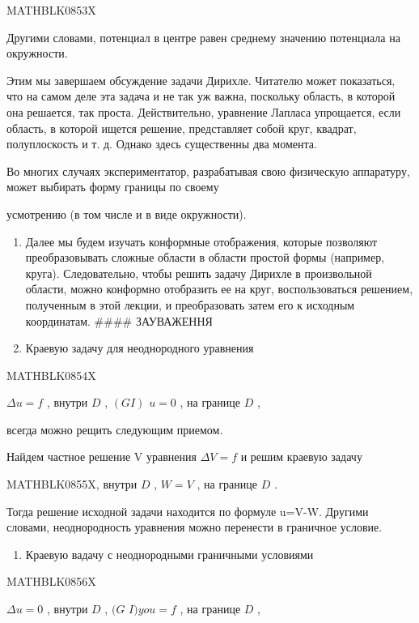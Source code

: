 \documentclass[
  ukrainian,
]{article}
\providecommand{\tightlist}{%
  \setlength{\itemsep}{0pt}\setlength{\parskip}{0pt}}
\begin{document}
MATHBLK0853X

Другими словами, потенциал в центре равен среднему значению потенциала
на окружности.

Этим мы завершаем обсуждение задачи Дирихле. Читателю может показаться,
что на самом деле эта задача и не так уж важна, поскольку область, в
которой она решается, так проста. Действительно, уравнение Лапласа
упрощается, если область, в которой ищется решение, представляет собой
круг, квадрат, полуплоскость и т. д. Однако здесь существенны два
момента.

Во многих случаях экспериментатор, разрабатывая свою физическую
аппаратуру, может выбирать форму границы по своему

усмотрению (в том числе и в виде окружности).

\begin{enumerate}
\def\labelenumi{\arabic{enumi}.}
\setcounter{enumi}{1}
\tightlist
\item
  Далее мы будем изучать конформные отображения, которые позволяют
  преобразовывать сложные области в области простой формы (например,
  круга). Следовательно, чтобы решить задачу Дирихле в произвольной
  области, можно конформно отобразить ее на круг, воспользоваться
  решением, полученным в этой лекции, и преобразовать затем его к
  исходным координатам. \#\#\#\# ЗАУВАЖЕННЯ
\item
  Краевую задачу для неоднородного уравнения
\end{enumerate}

MATHBLK0854X

\(\Delta u = f\) , внутри \(D\) , \((GI)\) \(u = 0\) , на границе \(D\)
,

всегда можно рещить следующим приемом.

Найдем частное решение V уравнения \(\Delta V = f\) и решим краевую
задачу

MATHBLK0855X, внутри \(D\) , \(W = V\) , на границе \(D\) .

Тогда решение исходной задачи находится по формуле u=V-W. Другими
словами, неоднородность уравнения можно перенести в граничное условие.

\begin{enumerate}
\def\labelenumi{\arabic{enumi}.}
\setcounter{enumi}{1}
\tightlist
\item
  Краевую вадачу с неоднородными граничными условиями
\end{enumerate}

MATHBLK0856X

\(\Delta u = 0\) , внутри \(D\) , \((G\) \(I ) you = f\) , на границе
\(D\) ,
\end{document}
